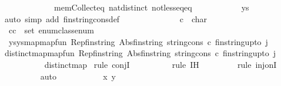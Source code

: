 \begin{isabellebody}
\ \ \ \ \ \ \ \ \ \ \ \ mem{\isacharunderscore}Collect{\isacharunderscore}eq\ nat{\isachardot}distinct{\isacharparenleft}{}{\isacharparenright}\ not{\isacharunderscore}less{\isacharunderscore}eq{\isacharunderscore}eq{\isacharparenright}\isanewline
\ \ \ \ \isamarkupfalse%
\isanewline
\ \ \ \ \isamarkupfalse%
\ \ ys\isanewline
\ \ \ \ \ \ \isamarkupfalse%
{\isacharparenleft}auto\ simp\ add{\isacharcolon}\ fin{\isacharunderscore}string{\isacharunderscore}cons{\isacharunderscore}def{\isacharparenright}\isanewline
\ \ \ \ \isamarkupfalse%
\ {\isacharminus}\isanewline
\ \ \ \ \ \ \isamarkupfalse%
\ c\ {\isacharcolon}{\isacharcolon}\ char\isanewline
\ \ \ \ \ \ \isamarkupfalse%
\ c{\isacharcolon}{\isachardoublequoteopen}c\ {\isasymin}\ set\ enum{\isacharunderscore}class{\isachardot}enum{\isachardoublequoteclose}\isanewline
\ \ \ \ \ \ \isamarkupfalse%
\ ys{\isacharcolon}{\isachardoublequoteopen}ys{\isacharequal}map{\isacharparenleft}map{\isacharunderscore}fun\ Rep{\isacharunderscore}fin{\isacharunderscore}string\ Abs{\isacharunderscore}fin{\isacharunderscore}string\ {\isacharparenleft}string{\isacharunderscore}cons\ c{\isacharparenright}{\isacharparenright}\ {\isacharparenleft}fin{\isacharunderscore}string{\isacharunderscore}upto\ j{\isacharparenright}{\isachardoublequoteclose}\isanewline
\ \ \ \ \ \ \isamarkupfalse%
{\isachardoublequoteopen}distinct{\isacharparenleft}map{\isacharparenleft}map{\isacharunderscore}fun\ Rep{\isacharunderscore}fin{\isacharunderscore}string\ Abs{\isacharunderscore}fin{\isacharunderscore}string\ {\isacharparenleft}string{\isacharunderscore}cons\ c{\isacharparenright}{\isacharparenright}\ {\isacharparenleft}fin{\isacharunderscore}string{\isacharunderscore}upto\ j{\isacharparenright}{\isacharparenright}{\isachardoublequoteclose}\isanewline
\ \ \ \ \ \ \ \ \isamarkupfalse%
\ distinct{\isacharunderscore}map\ \isamarkupfalse%
{\isacharparenleft}rule\ conjI{\isacharparenright}\isanewline
\ \ \ \ \ \ \ \ \ \isamarkupfalse%
{\isacharparenleft}rule\ IH{\isacharparenright}\isanewline
\ \ \ \ \ \ \ \ \isamarkupfalse%
{\isacharparenleft}rule\ inj{\isacharunderscore}onI{\isacharparenright}\isanewline
\ \ \ \ \ \ \ \ \isamarkupfalse%
{\isacharparenleft}auto{\isacharparenright}\isanewline
\ \ \ \ \ \ \ \ \isamarkupfalse%
\ \ x\ y\isanewline
\ \ \ \ \ \ \ \ \ \ \isamarkupfalse%

\end{isabellebody}
